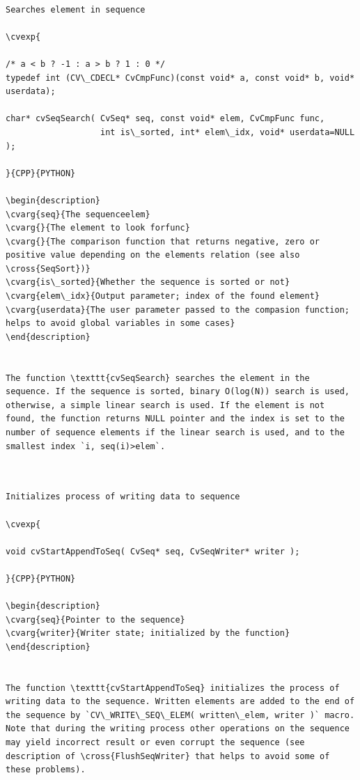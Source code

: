 \label{SeqSearch}
\begin{verbatim}

Searches element in sequence

\cvexp{

/* a < b ? -1 : a > b ? 1 : 0 */
typedef int (CV\_CDECL* CvCmpFunc)(const void* a, const void* b, void* userdata);

char* cvSeqSearch( CvSeq* seq, const void* elem, CvCmpFunc func,
                   int is\_sorted, int* elem\_idx, void* userdata=NULL );

}{CPP}{PYTHON}

\begin{description}
\cvarg{seq}{The sequenceelem}
\cvarg{}{The element to look forfunc}
\cvarg{}{The comparison function that returns negative, zero or positive value depending on the elements relation (see also \cross{SeqSort})}
\cvarg{is\_sorted}{Whether the sequence is sorted or not}
\cvarg{elem\_idx}{Output parameter; index of the found element}
\cvarg{userdata}{The user parameter passed to the compasion function; helps to avoid global variables in some cases}
\end{description}


The function \texttt{cvSeqSearch} searches the element in the sequence. If the sequence is sorted, binary O(log(N)) search is used, otherwise, a simple linear search is used. If the element is not found, the function returns NULL pointer and the index is set to the number of sequence elements if the linear search is used, and to the smallest index `i, seq(i)>elem`.


\end{verbatim}
\label{StartAppendToSeq}
\begin{verbatim}

Initializes process of writing data to sequence

\cvexp{

void cvStartAppendToSeq( CvSeq* seq, CvSeqWriter* writer );

}{CPP}{PYTHON}

\begin{description}
\cvarg{seq}{Pointer to the sequence}
\cvarg{writer}{Writer state; initialized by the function}
\end{description}


The function \texttt{cvStartAppendToSeq} initializes the process of writing data to the sequence. Written elements are added to the end of the sequence by `CV\_WRITE\_SEQ\_ELEM( written\_elem, writer )` macro. Note that during the writing process other operations on the sequence may yield incorrect result or even corrupt the sequence (see description of \cross{FlushSeqWriter} that helps to avoid some of these problems).


\end{verbatim}
